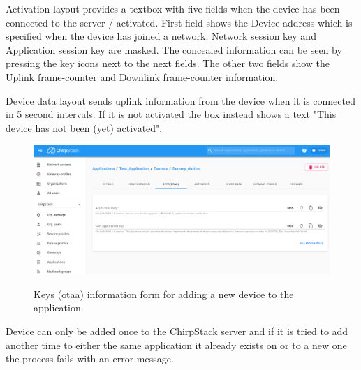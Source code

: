 Activation layout provides a textbox with five fields when the device has been connected to the server / activated.
First field shows the Device address which is specified when the device has joined a network.
Network session key and Application session key are masked.
The concealed information can be seen by pressing the key icons next to the next fields.
The other two fields show the Uplink frame-counter and Downlink frame-counter information.

Device data layout sends uplink information from the device when it is connected in 5 second intervals.
If it is not activated the box instead shows a text "This device has not been (yet) activated".


\begin{figure}[ht]
  \centering
  {\includegraphics[width=\textwidth]{illustration/ChirpStack_new_device_2.png}}
  \caption{Keys (\gls{otaa}) information form for adding a new device to the application.}
  \label{fig:ChirpStack_new_device_2}
\end{figure}

Device can only be added once to the ChirpStack server and if it is tried to add another time to either the same application it already exists on or to a new one the process fails with an error message.


\clearpage %
